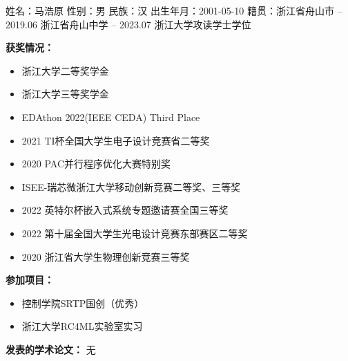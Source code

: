 \cleardoublepage
{}

\quad \newline
姓名：马浩原 \quad 性别：男 \quad 民族：汉 \newline
出生年月：2001-05-10 \quad 籍贯：浙江省舟山市  -- 2019.06 \quad 浙江省舟山中学  -- 2023.07 \quad 浙江大学攻读学士学位

\quad \newline
{\bfseries 获奖情况：}
\begin{itemize}
    \item 浙江大学二等奖学金
    \item 浙江大学三等奖学金
    \item EDAthon 2022(IEEE CEDA) Third Place
    \item 2021 TI杯全国大学生电子设计竞赛省二等奖
    \item 2020 PAC并行程序优化大赛特别奖
    \item ISEE-瑞芯微浙江大学移动创新竞赛二等奖、三等奖
    \item 2022 英特尔杯嵌入式系统专题邀请赛全国三等奖
    \item 2022 第十届全国大学生光电设计竞赛东部赛区二等奖
    \item 2020 浙江省大学生物理创新竞赛三等奖
\end{itemize}

\quad \newline
{\bfseries 参加项目：}
\begin{itemize}
    \item 控制学院SRTP国创（优秀）
    \item 浙江大学RC4ML实验室实习
\end{itemize}

\quad \newline
{\bfseries 发表的学术论文：}
无
